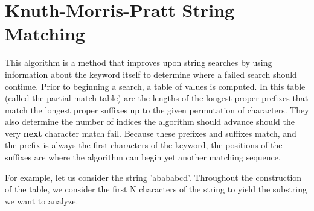 \section{Knuth-Morris-Pratt String Matching}
This algorithm is a method that improves upon string searches by using information about the keyword itself to determine where a failed search should continue.
Prior to beginning a search, a table of values is computed.
In this table (called the partial match table) are the lengths of the longest proper prefixes that match the longest proper suffixes up to the given permutation of characters.
They also determine the number of indices the algorithm should advance should the very \textbf{next} character match fail.
Because these prefixes and suffixes match, and the prefix is always the first characters of the keyword, the positions of the suffixes are where the algorithm can begin yet another matching sequence.

For example, let us consider the string 'abababcd'.
Throughout the construction of the table, we consider the first N characters of the string to yield the substring we want to analyze.

